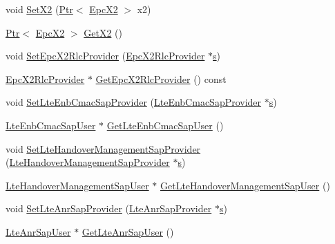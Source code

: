 \begin{DoxyCompactItemize}
\item 
void \hyperlink{classns3_1_1LteEnbRrc_ab674be62586a3ce432bfa1514e3ee1ed}{Set\+X2} (\hyperlink{classns3_1_1Ptr}{Ptr}$<$ \hyperlink{classns3_1_1EpcX2}{Epc\+X2} $>$ x2)
\item 
\hyperlink{classns3_1_1Ptr}{Ptr}$<$ \hyperlink{classns3_1_1EpcX2}{Epc\+X2} $>$ \hyperlink{classns3_1_1LteEnbRrc_aaff44254ddc86aeb2a4a735937007390}{Get\+X2} ()
\item 
void \hyperlink{classns3_1_1LteEnbRrc_a15ed098e5efa9339708932143a2286c9}{Set\+Epc\+X2\+Rlc\+Provider} (\hyperlink{classns3_1_1EpcX2RlcProvider}{Epc\+X2\+Rlc\+Provider} $\ast$\hyperlink{generate__test__data__lte__sinr_8m_ad83eeb3a142285d1243a08c6b7026df8}{s})
\item 
\hyperlink{classns3_1_1EpcX2RlcProvider}{Epc\+X2\+Rlc\+Provider} $\ast$ \hyperlink{classns3_1_1LteEnbRrc_aae6973f5624300ffb578f21635d435bd}{Get\+Epc\+X2\+Rlc\+Provider} () const 
\item 
void \hyperlink{classns3_1_1LteEnbRrc_af9407473b1bf55e9bbc8ee672d59b71f}{Set\+Lte\+Enb\+Cmac\+Sap\+Provider} (\hyperlink{classns3_1_1LteEnbCmacSapProvider}{Lte\+Enb\+Cmac\+Sap\+Provider} $\ast$\hyperlink{generate__test__data__lte__sinr_8m_ad83eeb3a142285d1243a08c6b7026df8}{s})
\item 
\hyperlink{classns3_1_1LteEnbCmacSapUser}{Lte\+Enb\+Cmac\+Sap\+User} $\ast$ \hyperlink{classns3_1_1LteEnbRrc_ac809f10e9807a74e210d936a437e8115}{Get\+Lte\+Enb\+Cmac\+Sap\+User} ()
\item 
void \hyperlink{classns3_1_1LteEnbRrc_ae128adb5b8d64a53911000f10169a719}{Set\+Lte\+Handover\+Management\+Sap\+Provider} (\hyperlink{classns3_1_1LteHandoverManagementSapProvider}{Lte\+Handover\+Management\+Sap\+Provider} $\ast$\hyperlink{generate__test__data__lte__sinr_8m_ad83eeb3a142285d1243a08c6b7026df8}{s})
\item 
\hyperlink{classns3_1_1LteHandoverManagementSapUser}{Lte\+Handover\+Management\+Sap\+User} $\ast$ \hyperlink{classns3_1_1LteEnbRrc_aa6435f7e400c92036cb9c20f6164df8d}{Get\+Lte\+Handover\+Management\+Sap\+User} ()
\item 
void \hyperlink{classns3_1_1LteEnbRrc_a478a940a49bd3acb6df0601820cd0cc0}{Set\+Lte\+Anr\+Sap\+Provider} (\hyperlink{classns3_1_1LteAnrSapProvider}{Lte\+Anr\+Sap\+Provider} $\ast$\hyperlink{generate__test__data__lte__sinr_8m_ad83eeb3a142285d1243a08c6b7026df8}{s})
\item 
\hyperlink{classns3_1_1LteAnrSapUser}{Lte\+Anr\+Sap\+User} $\ast$ \hyperlink{classns3_1_1LteEnbRrc_aecded4a490ea3bbdc55f0ebec1b722fd}{Get\+Lte\+Anr\+Sap\+User} ()

\end{DoxyCompactItemize}
